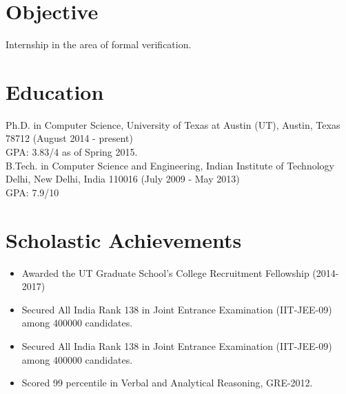 \documentclass[margin]{res}
\begin{document}
 
 
 
\address{{\bf Present Address} \\ 2901 Swisher Street \\ Austin, TX 78705  \\
        +1 512-952-0104 \\ mihir@cs.utexas.edu }
\address{{\bf Permanent Address} \\ 701 Digvijay Complex 2 \\ Ghod Dod
  Road\\ Surat, India 395001 \\
        +91 261 265 0249 }

 
\begin{resume} 
 
\section{Objective} 
Internship in the area of formal verification.

\section{Education} 
Ph.D. in Computer Science, University of Texas at Austin (UT), Austin,
Texas 78712 (August 2014 - present)\\
GPA: 3.83/4 as of Spring 2015.\\
B.Tech. in Computer Science and Engineering, Indian Institute of
Technology Delhi, New Delhi, India 110016 (July 2009 - May 2013)\\
GPA: 7.9/10

\section{Scholastic Achievements}
 \begin{itemize} \itemsep -2pt  %
 \item Awarded the UT Graduate School's College Recruitment
   Fellowship (2014-2017)
 \item Secured All India Rank 138 in Joint Entrance Examination
   (IIT-JEE-09) among 400000 candidates.
 \item Secured All India Rank 138 in Joint Entrance Examination
   (IIT-JEE-09) among 400000 candidates.
 \item Scored 99 percentile in Verbal and Analytical Reasoning,
   GRE-2012.
 \end{itemize}
 

\end{resume}
\end{document}
